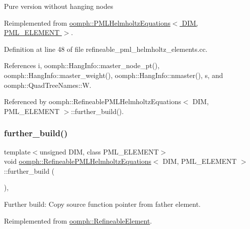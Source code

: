 Pure version without hanging nodes 

Reimplemented from \hyperlink{classoomph_1_1PMLHelmholtzEquations_ac066463c7af3e2f30146e47553508bce}{oomph\+::\+P\+M\+L\+Helmholtz\+Equations$<$ D\+I\+M, P\+M\+L\+\_\+\+E\+L\+E\+M\+E\+N\+T $>$}.



Definition at line 48 of file refineable\+\_\+pml\+\_\+helmholtz\+\_\+elements.\+cc.



References i, oomph\+::\+Hang\+Info\+::master\+\_\+node\+\_\+pt(), oomph\+::\+Hang\+Info\+::master\+\_\+weight(), oomph\+::\+Hang\+Info\+::nmaster(), s, and oomph\+::\+Quad\+Tree\+Names\+::W.



Referenced by oomph\+::\+Refineable\+P\+M\+L\+Helmholtz\+Equations$<$ D\+I\+M, P\+M\+L\+\_\+\+E\+L\+E\+M\+E\+N\+T $>$\+::further\+\_\+build().

\mbox{\label{classoomph_1_1RefineablePMLHelmholtzEquations_a9e3eb293598208404f88bc1c36003d6a}} 
\subsubsection{\texorpdfstring{further\+\_\+build()}{further\_build()}}
{\footnotesize\ttfamily template$<$unsigned D\+IM, class P\+M\+L\+\_\+\+E\+L\+E\+M\+E\+NT$>$ \\
void \hyperlink{classoomph_1_1RefineablePMLHelmholtzEquations}{oomph\+::\+Refineable\+P\+M\+L\+Helmholtz\+Equations}$<$ D\+IM, P\+M\+L\+\_\+\+E\+L\+E\+M\+E\+NT $>$\+::further\+\_\+build (\begin{DoxyParamCaption}{ }\end{DoxyParamCaption})\hspace{0.3cm}{\ttfamily [inline]}, {\ttfamily [virtual]}}



Further build\+: Copy source function pointer from father element. 



Reimplemented from \hyperlink{classoomph_1_1RefineableElement_a26628ce36dfad028686adeb4694a9ef3}{oomph\+::\+Refineable\+Element}.



